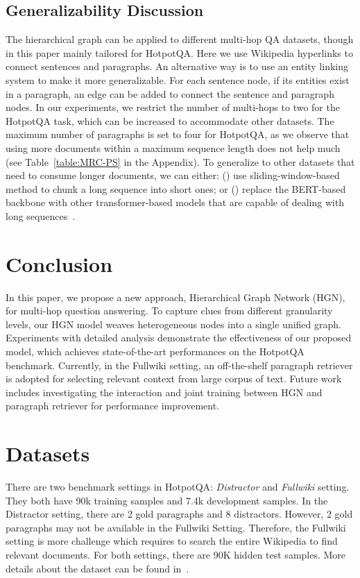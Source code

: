 \documentclass[11pt,a4paper]{article}
\begin{document}
\subsection{Generalizability Discussion}
The hierarchical graph can be applied to different multi-hop QA datasets, though in this paper mainly tailored for HotpotQA. 
Here we use Wikipedia hyperlinks to connect sentences and paragraphs. An alternative way is to use an entity linking system to make it more generalizable. For each sentence node, if its entities exist in a paragraph, an edge can be added to connect the sentence and paragraph nodes. In our experiments, we restrict the number of multi-hops to two for the HotpotQA task, which can be increased to accommodate other datasets.
The maximum number of paragraphs is set to four for HotpotQA, as we observe that using more documents within a maximum sequence length does not help much (see Table~\ref{table:MRC-PS} in the Appendix). 
To generalize to other datasets that need to consume longer documents, we can either: () use sliding-window-based method to chunk a long sequence into short ones; or () replace the BERT-based backbone with other transformer-based models that are capable of dealing with long sequences~\cite{Beltagy2020Longformer,zaheer2020big,wang2020cluster}.


\section{Conclusion}

In this paper, we propose a new approach, Hierarchical Graph Network (HGN), for multi-hop question answering. To capture clues from different granularity levels, our HGN model weaves heterogeneous nodes into a single unified graph. Experiments with detailed analysis demonstrate the effectiveness of our proposed model, which achieves state-of-the-art performances on the HotpotQA benchmark. Currently, in the Fullwiki setting, an off-the-shelf paragraph retriever is adopted for selecting relevant context from large corpus of text. Future work includes investigating the interaction and joint training between HGN and paragraph retriever for performance improvement.   




\appendix
\section{Datasets}
There are two benchmark settings in HotpotQA: \emph{Distractor} and \emph{Fullwiki} setting.
They both have 90k training samples and 7.4k development samples.
In the Distractor setting, there are 2 gold paragraphs and 8 distractors.
However, 2 gold paragraphs may not be available in the Fullwiki Setting.
Therefore, the Fullwiki setting is more challenge which requires to search the entire Wikipedia to find relevant documents.
For both settings, there are 90K hidden test samples. More details about the dataset can be found in~\citet{yang2018hotpotqa}.
\end{document}
